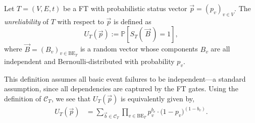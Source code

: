 \documentclass[runningheads]{llncs}
\renewcommand{\emph}[1]{{\it #1}}
\begin{document}
 

\begin{definition}\label{def:unreliability}
    Let $T=(V,E,t)$ be a FT with probabilistic status vector $\vec{p}=(p_v)_{v\in V}$. The \emph{unreliability} of $T$ with respect to $\vec{p}$ is defined as
    $$ U_T(\vec p) := \mathbb{P}\left[S_T\left(\,\vec{B}\,\right) = 1\right],$$
    where $\vec{B} = (B_v)_{v \in \text{BE}_T}$ is a random vector whose components $B_v$ are all independent and Bernoulli-distributed with probability $p_v$.
\end{definition}

This definition assumes all basic event failures to be independent---a standard assumption, since all dependencies are captured by the FT gates. 
Using the definition of $\mathcal{C}_T$, we see that $U_T(\vec{p})$ is equivalently given by,
\begin{align}\label{eq:UT}
    U_T(\vec{p}) &= \sum_{\vec{b} \in \mathcal{C}_T} \prod_{v \in \mathrm{BE}_T} p_v^{b_v} \cdot \bigl(1-p_v\bigr)^{(1-b_v)}.
\end{align}





\end{document}

